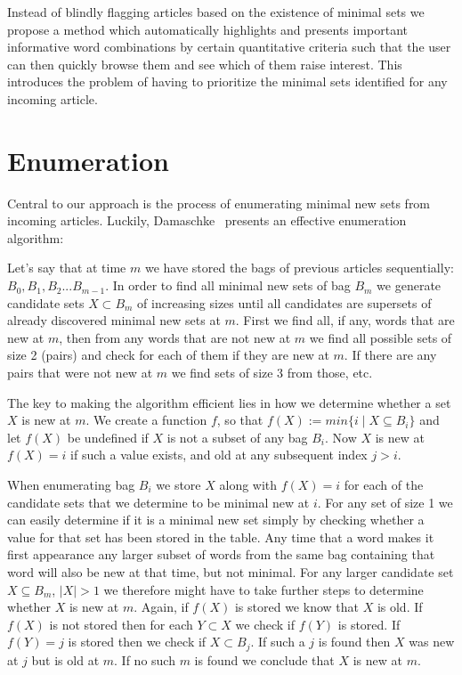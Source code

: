 Instead of blindly flagging articles based on the existence of minimal sets we propose a method which automatically highlights and presents important informative word combinations by certain quantitative criteria such that the user can then quickly browse them and see which of them raise interest. This introduces the problem of having to prioritize the minimal sets identified for any incoming article.

\section{Enumeration}
\label{method:enumeration}
Central to our approach is the process of enumerating minimal new sets from incoming articles. Luckily, Damaschke~\cite{damaschke2015pairs} presents an effective enumeration algorithm:

Let's say that at time $m$ we have stored the bags of previous articles sequentially: $B_0, B_1, B_2...B_{m-1}$. In order to find all minimal new sets of bag $B_{m}$ we generate candidate sets $X \subset B_{m}$ of increasing sizes until all candidates are supersets of already discovered minimal new sets at $m$. First we find all, if any, words that are new at $m$, then from any words that are not new at $m$ we find all possible sets of size 2 (pairs) and check for each of them if they are new at $m$. If there are any pairs that were not new at $m$ we find sets of size 3 from those, etc. 

The key to making the algorithm efficient lies in how we determine whether a set $X$ is new at $m$. We create a function $f$, so that $f(X) := min\{i \mid X \subseteq B_{i}\}$ and let $f(X)$ be undefined if $X$ is not a subset of any bag $B_{i}$. Now $X$ is new at $f(X)=i$ if such a value exists, and old at any subsequent index $j>i$. 

When enumerating bag $B_{i}$ we store $X$ along with $f(X)=i$ for each of the candidate sets that we determine to be minimal new at $i$. For any set of size 1 we can easily determine if it is a minimal new set simply by checking whether a value for that set has been stored in the table.  Any time that a word makes it first appearance any larger subset of words from the same bag containing that word will also be new at that time, but not minimal. For any larger candidate set $X \subseteq B_{m}$, $|X|>1$ we therefore might have to take further steps to determine whether $X$ is new at $m$. Again, if $f(X)$ is stored we know that $X$ is old. If $f(X)$ is not stored then for each $Y \subset X$ we check if $f(Y)$ is stored. If $f(Y)=j$ is stored then we check if $X \subset B_{j}$. If such a $j$ is found then $X$ was new at $j$ but is old at $m$. If no such $m$ is found we conclude that $X$ is new at $m$.


